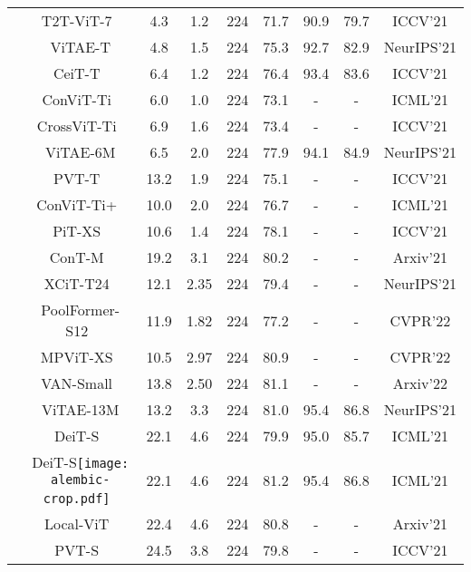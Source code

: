 \documentclass[twocolumn]{svjour3}          \smartqed  \usepackage{natbib}
\newcommand{\alambic}{\texttt{[image: alembic-crop.pdf]}\xspace}
\begin{document}
\begin{table*}[htbp]
{\begin{tabular}{c|c|ccc|cc|c|c}
          & T2T-ViT-7~\citep{yuan2021tokens} & 4.3   & 1.2   & 224   & 71.7  & 90.9  & 79.7 & ICCV'21 \\
          & {ViTAE-T} & 4.8   & 1.5   & 224   & 75.3  & 92.7  & 82.9 & NeurIPS'21 \\
\cline{2-9}          & CeiT-T~\citep{yuan2021incorporating} & 6.4   & 1.2   & 224   & 76.4  & 93.4  & 83.6 & ICCV'21 \\
          & ConViT-Ti~\citep{d2021convit} & 6.0   & 1.0   & 224   & 73.1  & -     & -  & ICML'21 \\
          & CrossViT-Ti~\citep{chen2021crossvit} & 6.9   & 1.6   & 224   & 73.4  & -     & - & ICCV'21 \\
          & {ViTAE-6M} & 6.5   & 2.0   & 224   & 77.9  & 94.1  & 84.9 & NeurIPS'21 \\
\cline{2-9}          & PVT-T~\citep{wang2021pyramid} & 13.2  & 1.9   & 224   & 75.1  & -     & - & ICCV'21 \\
          & ConViT-Ti+~\citep{d2021convit} & 10.0  & 2.0   & 224   & 76.7  & -     & - & ICML'21 \\
          & PiT-XS~\citep{heo2021rethinking} & 10.6  & 1.4   & 224   & 78.1  & -     & - & ICCV'21 \\
          & ConT-M~\citep{yan2021contnet} & 19.2  & 3.1   & 224   & 80.2  & -     & - & Arxiv'21 \\
          & 
          XCiT-T24~\citep{el2021xcit} & 12.1 & 2.35 & 224 & 79.4 & - & - & NeurIPS'21 \\
          & PoolFormer-S12~\citep{yu2022metaformer} & 11.9 & 1.82 & 224 & 77.2 & - & - & CVPR'22 \\
          & MPViT-XS~\citep{lee2022mpvit} & 10.5 & 2.97 & 224 & 80.9 &  - & - & CVPR'22 \\
          & VAN-Small~\citep{guo2022visual} & 13.8 & 2.50 & 224 & 81.1 & - & - & Arxiv'22 \\
          & ViTAE-13M & 13.2  & 3.3   & 224   & 81.0  & 95.4  & 86.8 & NeurIPS'21 \\
\cline{2-9}          & DeiT-S~\citep{touvron2020training} & 22.1  & 4.6   & 224   & 79.9  & 95.0  & 85.7 & ICML'21  \\
          & DeiT-S\alambic~\citep{touvron2020training} & 22.1  & 4.6   & 224   & 81.2  & 95.4  & 86.8  & ICML'21 \\
          & Local-ViT~\citep{li2021localvit} & 22.4 & 4.6 & 224 & 80.8 & - & - & Arxiv'21 \\
          & PVT-S~\citep{wang2021pyramid} & 24.5  & 3.8   & 224   & 79.8  & - & - & ICCV'21\\

\end{tabular}}
\end{table*}
\end{document}
